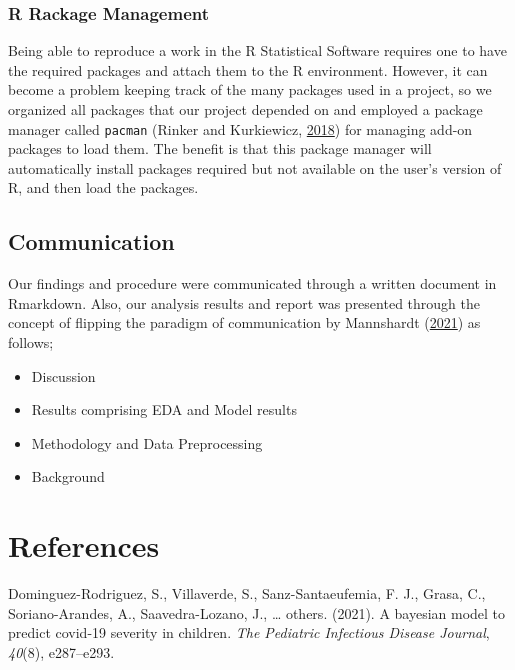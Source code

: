 \documentclass[
  10pt,
]{article}
\begin{document}
\hypertarget{r-rackage-management}{%
\subsubsection{R Rackage Management}\label{r-rackage-management}}

Being able to reproduce a work in the R Statistical Software requires one to have the required packages and attach them to the R environment. However, it can become a problem keeping track of the many packages used in a project, so we organized all packages that our project depended on and employed a package manager called \texttt{pacman} (Rinker and Kurkiewicz, \protect\hyperlink{ref-pacman}{2018}) for managing add-on packages to load them. The benefit is that this package manager will automatically install packages required but not available on the user's version of R, and then load the packages.

\hypertarget{communication}{%
\subsection{Communication}\label{communication}}

Our findings and procedure were communicated through a written document in Rmarkdown. Also, our analysis results and report was presented through the concept of flipping the paradigm of communication by Mannshardt (\protect\hyperlink{ref-elizabeth_flip}{2021}) as follows;

\begin{itemize}
\item
  Discussion
\item
  Results comprising EDA and Model results
\item
  Methodology and Data Preprocessing
\item
  Background
\end{itemize}

\newpage

\hypertarget{references}{%
\section*{References}\label{references}}

\hypertarget{refs}{}
\leavevmode\hypertarget{ref-dominguez2021bayesian}{}%
Dominguez-Rodriguez, S., Villaverde, S., Sanz-Santaeufemia, F. J., Grasa, C., Soriano-Arandes, A., Saavedra-Lozano, J., \ldots{} others. (2021). A bayesian model to predict covid-19 severity in children. \emph{The Pediatric Infectious Disease Journal}, \emph{40}(8), e287--e293.
\end{document}
